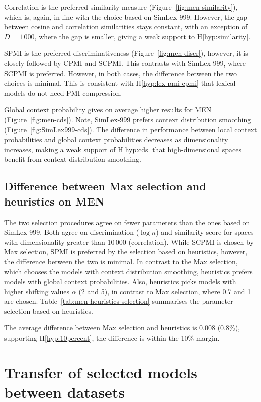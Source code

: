
Correlation is the preferred similarity measure (Figure~\ref{fig:men-similarity}), which is, again, in line with the choice based on SimLex-999. However, the gap between cosine and correlation similarities stays constant, with an exception of $D = 1\,000$, where the gap is smaller, giving a weak support to H\ref{hyp:similarity}.

SPMI is the preferred discriminativeness (Figure~\ref{fig:men-discr}), however, it is closely followed by CPMI and SCPMI. This contrasts with SimLex-999, where SCPMI is preferred. However, in both cases, the difference between the two choices is minimal. This is consistent with H\ref{hyp:lex-pmi-cpmi} that lexical models do not need PMI compression.


Global context probability gives on average higher results for MEN (Figure~\ref{fig:men-cds}). Note, SimLex-999 prefers context distribution smoothing (Figure~\ref{fig:SimLex999-cds}). The difference in performance between local context probabilities and global context probabilities decreases as dimensionality increases, making a weak support of H\ref{hyp:cds} that high-dimensional spaces benefit from context distribution smoothing.

\subsection{Difference between Max selection and heuristics on MEN}

The two selection procedures agree on fewer parameters than the ones based on SimLex-999. Both agree on discrimination ($\log n$) and similarity score for spaces with dimensionality greater than 10\,000 (correlation). While SCPMI is chosen by Max selection, SPMI is preferred by the selection based on heuristics, however, the difference between the two is minimal. In contrast to the Max selection, which chooses the models with context distribution smoothing, heuristics prefers models with global context probabilities. Also, heuristics picks models with higher shifting values $\alpha$ (2 and 5), in contrast to Max selection, where 0.7 and 1 are chosen. Table~\ref{tab:men-heuristics-selection} summarises the parameter selection based on heuristics.

The average difference between Max selection and heuristics is 0.008 (0.8\%), supporting H\ref{hyp:10percent}, the difference is within the 10\% margin.


\section{Transfer of selected models between datasets}
\label{sec:select-model-transf}

